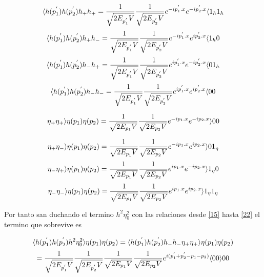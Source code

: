  \begin{equation}
\langle{h(p_{1}^{'})h(p_{2}^{'})}h_{+}h_{+}=\frac{1}{\sqrt{2E_{p_{1}^{'}}V}}\frac{1}{\sqrt{2E_{p_{2}^{'}}V}}e^{-ip_{1}^{'}.x}e^{-ip_{2}^{'}.x}\langle{1_{h}1_{h}}
 \label{15}
 \end{equation}
\begin{equation}
\langle{h(p_{1}^{'})h(p_{2}^{'})}h_{+}h_{-}=\frac{1}{\sqrt{2E_{p_{1}^{'}}V}}\frac{1}{\sqrt{2E_{p_{2}^{'}}V}}e^{-ip_{1}^{'}.x}e^{ip_{2}^{'}.x}\langle{1_{h}0}
 \label{16}
 \end{equation}
\begin{equation}
\langle{h(p_{1}^{'})h(p_{2}^{'})}h_{-}h_{+}=\frac{1}{\sqrt{2E_{p_{1}^{'}}V}}\frac{1}{\sqrt{2E_{p_{2}^{'}}V}}e^{ip_{1}^{'}.x}e^{-ip_{2}^{'}.x}\langle{01_{h}}
 \label{17}
 \end{equation}
\begin{equation}
\langle{h(p_{1}^{'})h(p_{2}^{'})}h_{-}h_{-}=\frac{1}{\sqrt{2E_{p_{1}^{'}}V}}\frac{1}{\sqrt{2E_{p_{2}^{'}}V}}e^{ip_{1}^{'}.x}e^{ip_{2}^{'}.x}\langle{00}
 \label{18}
 \end{equation}

\begin{equation}
\eta_{+}\eta_{+}\rangle{\eta(p_{1})\eta(p_{2})}=\frac{1}{\sqrt{2E_{p_{1}}V}}\frac{1}{\sqrt{2E_{p_{2}}V}}e^{-ip_{1}.x}e^{-ip_{2}.x}\rangle{00}
 \label{19}
 \end{equation}


\begin{equation}
\eta_{+}\eta_{-}\rangle{\eta(p_{1})\eta(p_{2})}=\frac{1}{\sqrt{2E_{p_{1}}V}}\frac{1}{\sqrt{2E_{p_{2}}V}}e^{-ip_{1}.x}e^{ip_{2}.x}\rangle{01_{\eta}}
 \label{20}
 \end{equation}
\begin{equation}
\eta_{-}\eta_{+}\rangle{\eta(p_{1})\eta(p_{2})}=\frac{1}{\sqrt{2E_{p_{1}}V}}\frac{1}{\sqrt{2E_{p_{2}}V}}e^{ip_{1}.x}e^{-ip_{2}.x}\rangle{1_{\eta}0}
 \label{21}
 \end{equation}
\begin{equation}
\eta_{-}\eta_{-}\rangle{\eta(p_{1})\eta(p_{2})}=\frac{1}{\sqrt{2E_{p_{1}}V}}\frac{1}{\sqrt{2E_{p_{2}}V}}e^{ip_{1}.x}e^{ip_{2}.x}\rangle{1_{\eta}1_{\eta}}
 \label{22}
 \end{equation}

Por tanto san duchando el termino $h^{2}\eta_{0}^{2}$ con las relaciones desde \ref{15} hasta \ref{22} el termino que sobrevive es


\begin{equation*}
\langle{h(p_{1}^{'})h(p_{2}^{'})}h^{2}\eta_{0}^{2}\rangle{\eta(p_{1})\eta(p_{2})}=\langle{h(p_{1}^{'})h(p_{2}^{'})}h_{-}h_{-}\eta_{+}\eta_{+}\rangle{\eta(p_{1})\eta(p_{2})}
\end{equation*}
\begin{equation}
=\frac{1}{\sqrt{2E_{p_{1}^{'}}V}}\frac{1}{\sqrt{2E_{p_{2}^{'}}V}}\frac{1}{\sqrt{2E_{p_{1}}V}}\frac{1}{\sqrt{2E_{p_{2}}V}}e^{i(p_{1}^{'}+p_{2}^{'}-p_{1}-p_{2})}\langle{00}\rangle{00}
\label{23}
\end{equation}

